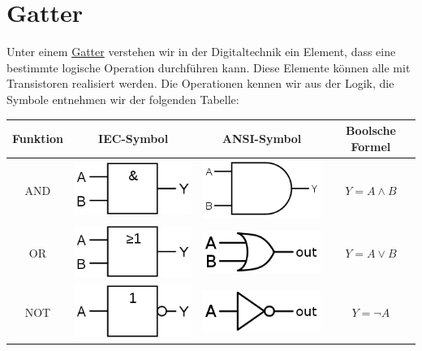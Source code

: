 \documentclass{report}
\begin{document}
\section{Gatter}
Unter einem \underline{Gatter} verstehen wir in der Digitaltechnik ein Element, dass eine bestimmte logische Operation durchführen kann. Diese Elemente können alle mit Transistoren realisiert werden. Die Operationen kennen wir aus der Logik, die Symbole entnehmen wir der folgenden Tabelle:
\begin{center}\begin{tabular}{c c c c}
Funktion & IEC-Symbol & ANSI-Symbol & Boolsche Formel \\ \hline
AND & \includegraphics[scale=0.2]{img/gatter_IEC_AND.png} & \includegraphics[scale=0.2]{img/gatter_ANSI_AND.png} &  $Y = A \land B$ \\
OR & \includegraphics[scale=0.2]{img/gatter_IEC_OR.png} & \includegraphics[scale=0.2]{img/gatter_ANSI_OR.png} &  $Y = A \lor B$ \\
NOT & \includegraphics[scale=0.2]{img/gatter_IEC_NOT.png} & \includegraphics[scale=0.2]{img/gatter_ANSI_NOT.png} &  $Y = \lnot A$ \\

\end{tabular}
\end{center}
\end{document}
